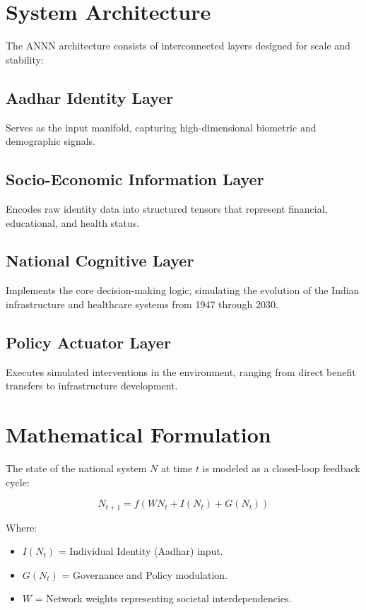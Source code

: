 \documentclass[12pt]{article}
\begin{document}
\section{System Architecture}

The ANNN architecture consists of interconnected layers designed for scale and stability:

\subsection{Aadhar Identity Layer}
Serves as the input manifold, capturing high-dimensional biometric and demographic signals.

\subsection{Socio-Economic Information Layer}
Encodes raw identity data into structured tensors that represent financial, educational, and health status.

\subsection{National Cognitive Layer}
Implements the core decision-making logic, simulating the evolution of the Indian infrastructure and healthcare systems from 1947 through 2030.

\subsection{Policy Actuator Layer}
Executes simulated interventions in the environment, ranging from direct benefit transfers to infrastructure development.

\section{Mathematical Formulation}

The state of the national system $N$ at time $t$ is modeled as a closed-loop feedback cycle:

\[
N_{t+1} = f(W N_t + I(N_t) + G(N_t))
\]

Where:
\begin{itemize}
\item $I(N_t)$ = Individual Identity (Aadhar) input.
\item $G(N_t)$ = Governance and Policy modulation.
\item $W$ = Network weights representing societal interdependencies.
\end{itemize}
\end{document}
